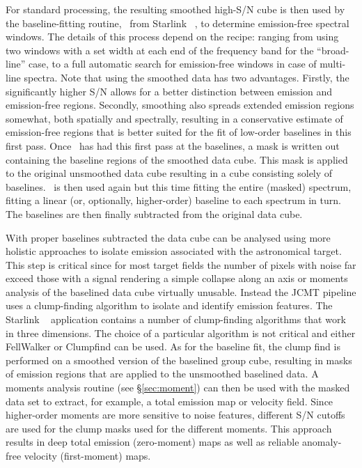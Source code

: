 \documentclass[final,authoryear,5p,times,twocolumn]{elsarticle}
\begin{document}
For standard processing, the resulting smoothed high-S/N cube
is then used by the baseline-fitting routine, \mfittrend\ from
Starlink \KAPPA\ \citep[][, see \S\ref{sec:mfittrend}]{SUN95,2008ASPC..394..650C},
to determine emission-free spectral windows.
The details of this process depend on the recipe: ranging from using two
windows with a set width at each end of the frequency band
for the ``broad-line'' case, to a full automatic search for emission-free
windows in case of multi-line spectra. Note that using the smoothed data has
two advantages. Firstly, the significantly higher S/N allows for a better
distinction between emission and emission-free regions. Secondly, smoothing
also spreads extended emission regions somewhat, both spatially and spectrally,
resulting in a conservative estimate of emission-free regions that is better suited for
the fit of low-order baselines in this first pass. Once \mfittrend\ has
had this first pass at the baselines, a mask is written out containing the
baseline regions of the smoothed data cube. This mask is applied to the original
unsmoothed data cube resulting in a cube consisting solely of
baselines. \mfittrend\ is then used again but this time fitting
the entire (masked) spectrum, fitting a linear (or, optionally, higher-order) baseline
to each spectrum in turn. The baselines are then finally subtracted from the
original data cube.

With proper baselines subtracted the data cube can be analysed using more
holistic approaches to isolate emission associated with the astronomical
target. This step is critical since for most target fields the number of pixels with
noise far exceed those with a signal rendering a simple collapse along an axis
or moments analysis of the baselined data cube virtually unusable. Instead
the JCMT pipeline uses a clump-finding algorithm to isolate and identify
emission features.
The Starlink \cupid\ \citep[][]{2007ASPC..376..425B} application contains
a number of clump-finding algorithms that work in three dimensions.
The choice of a particular algorithm is not critical and either FellWalker \citep{2015FW} or
Clumpfind \citep[][]{1994ApJ...428..693W} can be used.
As for the baseline fit, the clump find is performed on a smoothed version
of the baselined group cube, resulting in masks of emission regions that
are applied to the unsmoothed baselined data. A moments analysis routine
(see \mbox{\S \ref{sec:moment}}) can then be used with the masked data set to
extract, for example, a total emission map or velocity field. Since higher-order moments are
more sensitive to noise features, different S/N cutoffs are used for the
clump masks used for the different moments. This approach results in deep
total emission (zero-moment) maps as well as reliable anomaly-free
velocity (first-moment) maps.
\end{document}
